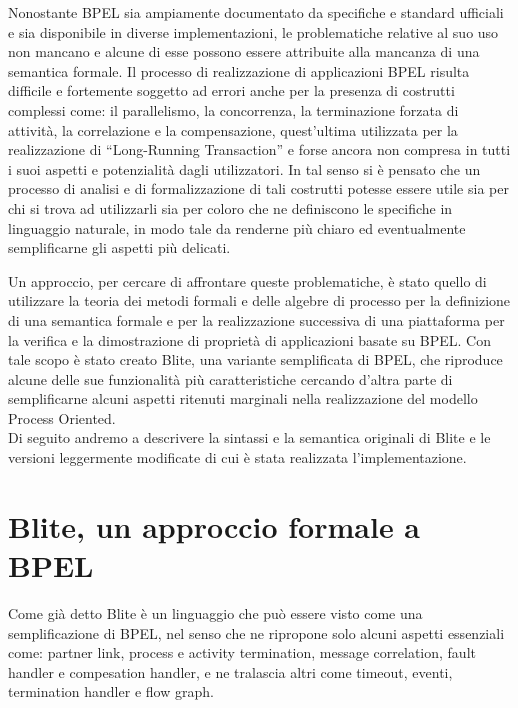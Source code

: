 \vspace{1cm}
Nonostante BPEL sia ampiamente documentato da specifiche e standard ufficiali e
sia disponibile in diverse implementazioni, le problematiche relative al suo
uso non mancano e alcune di esse possono essere attribuite alla
mancanza di una semantica formale. Il processo di realizzazione di applicazioni BPEL
risulta difficile e fortemente soggetto ad errori anche per la presenza di
costrutti complessi come: il parallelismo, la concorrenza, la terminazione
forzata di attività, la correlazione e la compensazione, quest'ultima utilizzata
per la realizzazione di ``Long-Running Transaction'' e forse ancora non 
compresa in tutti i suoi aspetti e potenzialità dagli utilizzatori. In tal
senso si è pensato che un processo di analisi e di formalizzazione di
tali costrutti potesse essere utile sia per chi si trova ad utilizzarli sia per
coloro che ne definiscono le specifiche in linguaggio naturale, in modo tale da
renderne più chiaro ed eventualmente semplificarne gli aspetti più delicati.

Un approccio, per cercare di affrontare queste problematiche, è stato quello di
utilizzare la teoria dei metodi formali e delle algebre di processo per la
definizione di una semantica formale e per la realizzazione successiva di una
piattaforma per la verifica e la dimostrazione di proprietà di applicazioni
basate su BPEL. Con tale scopo è stato creato Blite, una variante semplificata di
BPEL, che riproduce alcune delle sue funzionalità più caratteristiche cercando
d'altra parte di semplificarne alcuni aspetti ritenuti marginali nella
realizzazione del modello Process Oriented.
\\   

Di seguito andremo a descrivere la sintassi e  la semantica originali di Blite e
le versioni leggermente modificate di cui è stata realizzata l'implementazione.

\section{Blite, un approccio formale a BPEL}
\label{sec:blite}
Come già detto Blite è un linguaggio che può essere visto come una
semplificazione di BPEL, nel senso che ne ripropone solo alcuni aspetti
essenziali come: partner link, process e activity termination, message
correlation, fault handler e compesation handler, e ne tralascia altri come
timeout, eventi, termination handler e flow graph.

